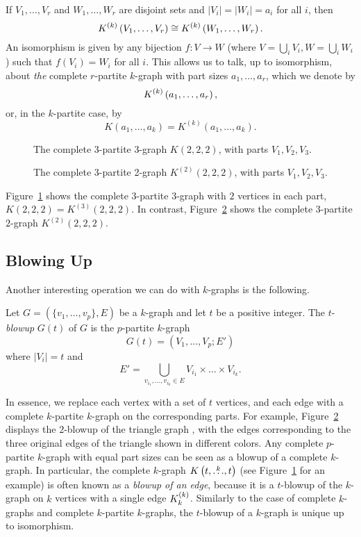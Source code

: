 If $V_1, \dots, V_r$ and $W_1, \dots, W_r$ are disjoint sets
and $|V_i| = |W_i| = a_i$ for all $i$, then
\[
    K^{(k)}\left(V_1, \dots, V_r\right) \cong K^{(k)}\left(W_1, \dots, W_r\right).
\]
An isomorphism is given by any bijection $f: V \to W$ (where $V=\bigcup_i V_i, W=\bigcup_i W_i$)
such that $f(V_i) = W_i$ for all $i$.
This allows us to talk, up to isomorphism, about \emph{the} complete $r$-partite $k$-graph
with part sizes $a_1, \dots, a_r$, which we denote by
\[
    K^{(k)}\left(a_1, \dots, a_r\right),
\]
or, in the $k$-partite case, by
\[
    K(a_1, \dots, a_k) = K^{(k)}(a_1, \dots, a_k).
\]

\begin{figure}[htbp]
    \centering
    
    \caption{The complete 3-partite 3-graph $K(2, 2, 2)$, with parts $V_1, V_2, V_3$.}
    \label{fig:222}
\end{figure}

\begin{figure}[htbp]
    \centering
    
    \caption{The complete 3-partite 2-graph $K^{(2)}(2, 2, 2)$, with parts $V_1, V_2, V_3$.}
    \label{fig:k2_222}
\end{figure}

Figure~\ref{fig:222} shows the complete $3$-partite $3$-graph
with $2$ vertices in each part, $K(2, 2, 2) = K^{(3)}(2, 2, 2)$.
In contrast, Figure~\ref{fig:k2_222} shows the complete $3$-partite $2$-graph
$K^{(2)}(2, 2, 2)$.

\subsection{Blowing Up} \label{subsec:blowup}
Another interesting operation we can do with $k$-graphs is the following.

\begin{definition}
    Let $G = (\{v_1, \dots, v_p\}, E)$ be a $k$-graph and let $t$ be a positive integer.
    The $t$-\emph{blowup} $G(t)$ of $G$ is the $p$-partite $k$-graph
    \[
        G(t) = (V_1, \dots, V_p; E')
    \]
    where $|V_i| = t$ and
    \[
        E' = \bigcup_{v_{i_1}, \dots, v_{i_k} \in E} V_{i_1} \times \dots \times V_{i_k}.
    \]
\end{definition}

In essence, we replace each vertex with a set of $t$ vertices, and each edge with a complete $k$-partite $k$-graph
on the corresponding parts.
For example, Figure~\ref{fig:k2_222} displays the $2$-blowup of the triangle graph ,
with the edges corresponding to the three original edges of the triangle shown in different colors.
Any complete $p$-partite $k$-graph with equal part sizes can be seen as a blowup of a complete $k$-graph.
In particular, the complete $k$-graph $K\left(t, \overset{k}{\dots}, t\right)$ (see Figure~\ref{fig:222} for an example)
is often known as a \emph{blowup of an edge}, because it is a $t$-blowup of the
$k$-graph on $k$ vertices with a single edge $K^{(k)}_{k}$.
Similarly to the case of complete $k$-graphs and complete $k$-partite $k$-graphs,
the $t$-blowup of a $k$-graph is unique up to isomorphism.

